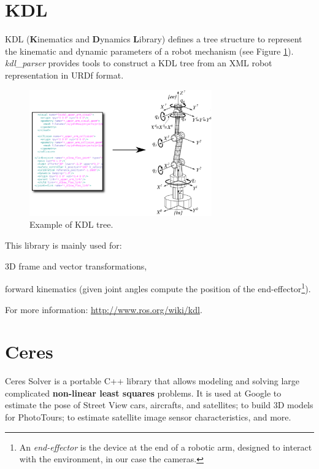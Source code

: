\section{KDL}
\label{sec:KDL}

KDL (\textbf{K}inematics and \textbf{D}ynamics \textbf{L}ibrary) defines a tree structure to represent the kinematic and dynamic parameters of a robot mechanism (see Figure \ref{fig:KDL}). \textit{kdl\_parser} provides tools to construct a KDL tree from an XML robot representation in URDf format.

\begin{figure}[!htbp]
 \centering
 \includegraphics[width=0.7\textwidth]{images/KDL02.png}
 \caption{Example of KDL tree.}
 \label{fig:KDL}
\end{figure}

This library is mainly used for:
\begin{itemize*}
 \item 3D frame and vector transformations,
 \item forward kinematics (given joint angles compute the position of the end-effector\footnote{An \textit{end-effector} is the device at the end of a robotic arm, designed to interact with the environment, in our case the cameras.}).
\end{itemize*}


For more information: \url{http://www.ros.org/wiki/kdl}.

\section{Ceres}
\label{sec:Ceres}

Ceres Solver \cite{ceres} is a portable C++ library that allows modeling and solving large complicated \textbf{non-linear least squares} problems. It is used at Google to estimate the pose of Street View cars, aircrafts, and satellites; to build 3D models for PhotoTours; to estimate satellite image sensor characteristics, and more.

